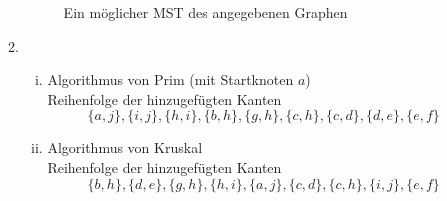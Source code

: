 \documentclass[a4paper]{scrartcl}
\begin{document}
\begin{enumerate}[label=\bfseries\arabic*.]
\begin{enumerate}
\begin{figure}[h]
                    \caption{Ein möglicher MST des angegebenen Graphen}
                    \label{fig:mst-4}
                \end{figure}

            \item
                \begin{enumerate}[(i)]
                    \item Algorithmus von Prim (mit Startknoten $a$) \\
                        Reihenfolge der hinzugefügten Kanten
                        \begin{equation}
                            \{ a, j \},
                            \{ i, j \},
                            \{ h, i \},
                            \{ b, h \},
                            \{ g, h \},
                            \{ c, h \},
                            \{ c, d \},
                            \{ d, e \},
                            \{ e, f \}
                        \end{equation}

                    \item Algorithmus von Kruskal \\
                        Reihenfolge der hinzugefügten Kanten
                        \begin{equation}
                            \{ b, h \},
                            \{ d, e \},
                            \{ g, h \},
                            \{ h, i \},
                            \{ a, j \},
                            \{ c, d \},
                            \{ c, h \},
                            \{ i, j \},
                            \{ e, f \}
                        \end{equation}


\end{enumerate}
\end{enumerate}
\end{enumerate}
\end{document}
